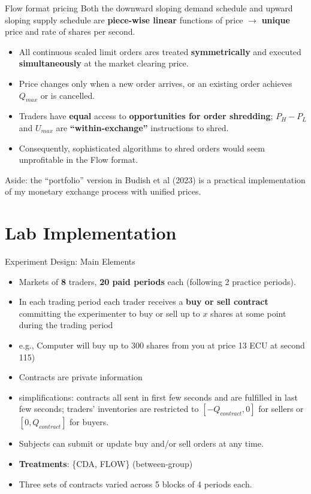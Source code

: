 \documentclass[10pt]{beamer}
\begin{document}
\begin{frame}{Flow format pricing}
Both the downward sloping demand schedule and upward sloping supply schedule are \textbf{piece-wise linear} functions of price $\rightarrow$ \textbf{unique} price and rate of shares per second. \pause
\begin{itemize}
\item All continuous scaled limit orders ares treated \textbf{symmetrically} and executed \textbf{simultaneously} at the market clearing price. \pause
\item Price changes only when a new order arrives, or an existing order achieves $Q_{max}$ or is cancelled.
\item Traders have \textbf{equal} access to \textbf{opportunities for order shredding}; $P_H - P_L$ and $U_{max}$ are  \textbf{``within-exchange''}
instructions to shred. \pause
\item Consequently, sophisticated algorithms to shred orders would seem unprofitable in the Flow format.
    \end{itemize} \pause
Aside: the ``portfolio'' version in Budish et al (2023) is a practical implementation of my monetary exchange process with unified prices. 
\end{frame}

\section{Lab Implementation}

\begin{frame}{Experiment Design: Main Elements}
    \begin{itemize}
        \item Markets of \textbf{8} traders, \textbf{20 paid periods} each (following 2 practice periods). \pause
        \item In each trading period each trader receives a \textbf{buy or sell contract} committing the experimenter to buy or sell up to $x$ shares at some point during the trading period 
        \item e.g., Computer will buy up to 300 shares from you at price 13 ECU at second 115) 
        \item Contracts are private information \pause
        \item simplifications: contracts all sent in first few seconds and are fulfilled in last few seconds; traders' inventories are restricted to $[-Q_{contract}, 0]$ for sellers or $[0, Q_{contract}]$ for buyers.
        \item Subjects can submit or update buy and/or sell orders at any time. \pause
        \item \textbf{Treatments}: \{CDA, FLOW\} (between-group)
        \item Three sets of contracts varied across 5 blocks of 4 periods each. 
    \end{itemize}
\end{frame}
\end{document}
